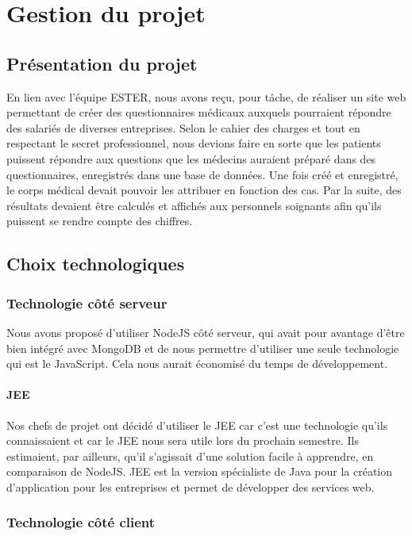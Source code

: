 \chapter{Gestion du projet}

\section{Présentation du projet}

En lien avec l'équipe ESTER, nous avons reçu, pour tâche, de réaliser un site web permettant de créer des questionnaires médicaux auxquels pourraient répondre des salariés de diverses entreprises. Selon le cahier des charges et tout en respectant le secret professionnel, nous devions faire en sorte que les patients puissent répondre aux questions que les médecins auraient préparé dans des questionnaires, enregistrés dans une base de données. Une fois créé et enregistré, le corps médical devait pouvoir les attribuer en fonction des cas. Par la suite, des résultats devaient être calculés et affichés aux personnels soignants afin qu'ils puissent se rendre compte des chiffres. 

\section{Choix technologiques}

\subsection{Technologie côté serveur}

Nous avons proposé d'utiliser NodeJS côté serveur, qui avait pour avantage d'être bien intégré avec MongoDB
et de nous permettre d'utiliser une seule technologie qui est le JavaScript. Cela nous aurait économisé du 
temps de développement.

\subsubsection{JEE}

Nos chefs de projet ont décidé d'utiliser le JEE car c'est une technologie qu'ils connaissaient et car le 
JEE nous sera utile lors du prochain semestre. Ils estimaient, par ailleurs, qu'il s'agissait d'une solution facile à apprendre, en comparaison de NodeJS. 
JEE est la version spécialiste de Java pour la création 
d'application pour les entreprises et permet de développer des services web.

\subsection{Technologie côté client}


